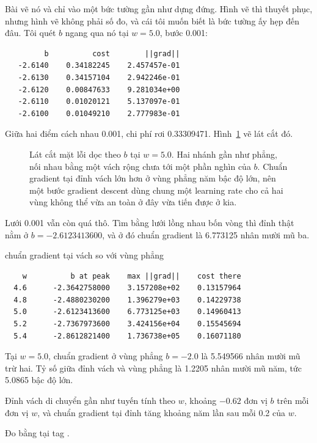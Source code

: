 Bài vẽ nó và chỉ vào một bức tường gần như dựng đứng. Hình vẽ thì thuyết phục,
nhưng hình vẽ không phải số đo, và cái tôi muốn biết là bức tường ấy hẹp đến
đâu. Tôi quét \(b\) ngang qua nó tại \(w = 5.0\), bước 0.001:

\begin{verbatim}
         b          cost        ||grad||
   -2.6140    0.34182245    2.457457e-01
   -2.6130    0.34157104    2.942246e-01
   -2.6120    0.00847633    9.281034e+00
   -2.6110    0.01020121    5.137097e-01
   -2.6100    0.01049210    2.777983e-01
\end{verbatim}

Giữa hai điểm cách nhau 0.001, chi phí rơi 0.33309471. Hình~\ref{fig:ch03-vach-mat-loi}
vẽ lát cắt đó.

\begin{figure}[htbp]
  \centering
  
  \caption{Lát cắt mặt lỗi dọc theo \(b\) tại \(w = 5.0\). Hai nhánh gần như
    phẳng, nối nhau bằng một vách rộng chưa tới một phần nghìn của \(b\). Chuẩn
    gradient tại đỉnh vách lớn hơn ở vùng phẳng năm bậc độ lớn, nên một bước
    gradient descent dùng chung một learning rate cho cả hai vùng không thể vừa
    an toàn ở đây vừa tiến được ở kia.}
  \label{fig:ch03-vach-mat-loi}
\end{figure}

Lưới 0.001 vẫn còn quá thô. Tìm bằng lưới lồng nhau bốn vòng thì đỉnh thật nằm
ở \(b = -2.6123413600\), và ở đó chuẩn gradient là 6.773125 nhân mười mũ ba.

\begin{measured}{chuẩn gradient tại vách so với vùng phẳng}
\begin{verbatim}
    w          b at peak    max ||grad||    cost there
  4.6      -2.3642758000    3.157208e+02    0.13157964
  4.8      -2.4880230200    1.396279e+03    0.14229738
  5.0      -2.6123413600    6.773125e+03    0.14960413
  5.2      -2.7367973600    3.424156e+04    0.15545694
  5.4      -2.8612821400    1.736738e+05    0.16071180
\end{verbatim}

Tại \(w = 5.0\), chuẩn gradient ở vùng phẳng \(b = -2.0\) là
5.549566 nhân mười mũ trừ hai. Tỷ số giữa đỉnh vách và vùng phẳng là
1.2205 nhân mười mũ năm, tức 5.0865 bậc độ lớn.

Đỉnh vách di chuyển gần như tuyến tính theo \(w\), khoảng \(-0.62\) đơn vị
\(b\) trên mỗi đơn vị \(w\), và chuẩn gradient tại đỉnh tăng khoảng năm lần sau mỗi
0.2 của \(w\).

Đo bằng  tại tag .
\end{measured}

